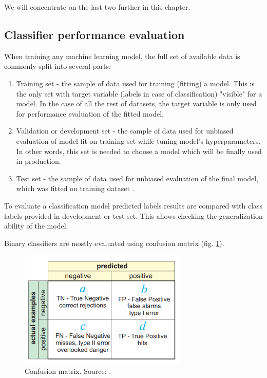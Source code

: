 We will concentrate on the last two further in this chapter.

\subsection{Classifier performance evaluation}

When training any machine learning model, the full set of available data is commonly split into several parts:
\begin{enumerate}
    \item Training set - the sample of data used for training (fitting) a model. This is the only set with target variable (labels in case of classification) "visible" for a model. In the case of all the rest of datasets, the target variable is only used for performance evaluation of the fitted model. 
    \item Validation or development set - the sample of data used for unbiased evaluation of model fit on training set while tuning model's hyperparameters. In other words, this set is needed to choose a model which will be finally used in production.
    \item Test set - the sample of data used for unbiased evaluation of the final model, which was fitted on training dataset \citep{Kuhn-2013}.
\end{enumerate}

To evaluate a classification model predicted labels results are compared with class labels provided in development or test set. This allows checking the generalization ability of the model.

Binary classifiers  are mostly evaluated using confusion matrix (fig. \ref{fig:confusion-matrix}).

\begin{figure}[h]
    \centering
    \includegraphics[width=8cm]{Images/Confusion-matrix.png}
    \caption{Confusion matrix. Source: \citep{kohavi:glossary}.}
    \label{fig:confusion-matrix}
\end{figure}

